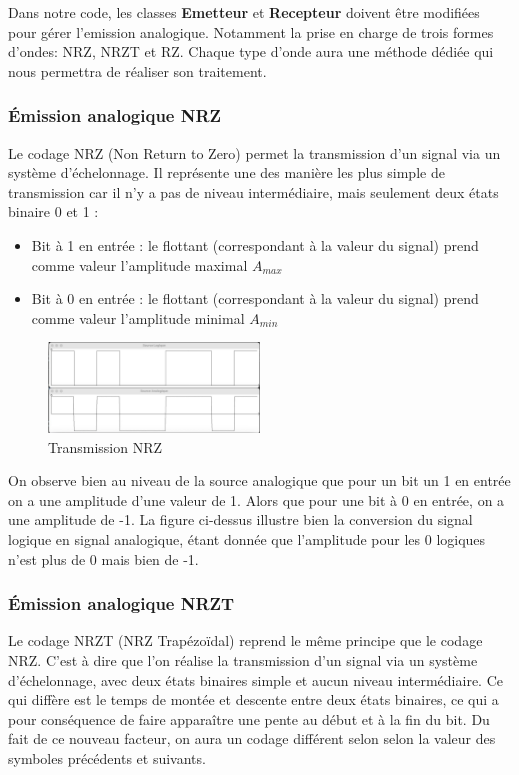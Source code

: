 Dans notre code, les classes \textbf{Emetteur} et \textbf{Recepteur} doivent être modifiées pour gérer l’emission analogique. Notamment la prise en charge de trois formes d’ondes: NRZ, NRZT et RZ. Chaque type d’onde aura une méthode dédiée qui nous permettra de réaliser son traitement.

\subsubsection{Émission analogique NRZ}
Le codage NRZ (Non Return to Zero) permet la transmission d’un signal via un système d’échelonnage. Il représente une des manière les plus simple de transmission car il n’y a pas de niveau intermédiaire, mais seulement deux états binaire 0 et 1 :

\begin{itemize}
    \item Bit à 1 en entrée : le flottant (correspondant à la valeur du signal) prend comme valeur l’amplitude maximal $A_{max}$
    \item Bit à 0 en entrée : le flottant (correspondant à la valeur du signal) prend comme valeur l’amplitude minimal $A_{min}$
\end{itemize}

\begin{figure}[H]
    \centering
    \includegraphics[width=0.5\textwidth]{img/etape2_transmission_NRZ.png}
    \caption{Transmission NRZ}
    \label{fig:transmission_nrz}
\end{figure}

On observe bien au niveau de la source analogique que pour un bit un 1 en entrée on a une amplitude d’une valeur de 1. Alors que pour une bit à 0 en entrée, on a une amplitude de -1. La figure ci-dessus illustre bien la conversion du signal logique en signal analogique, étant donnée que l’amplitude pour les 0 logiques n’est plus de 0 mais bien de -1.

\subsubsection{Émission analogique NRZT}

Le codage NRZT (NRZ Trapézoïdal) reprend le même principe que le codage NRZ. C’est à dire que l’on réalise la transmission d’un signal via un système d’échelonnage, avec deux états binaires simple et aucun  niveau intermédiaire. Ce qui diffère est le temps de montée et descente entre deux états binaires, ce qui a pour conséquence  de faire apparaître une pente au début et à la fin du bit. Du fait de ce nouveau facteur, on aura un codage différent selon selon la valeur des symboles précédents et suivants.

